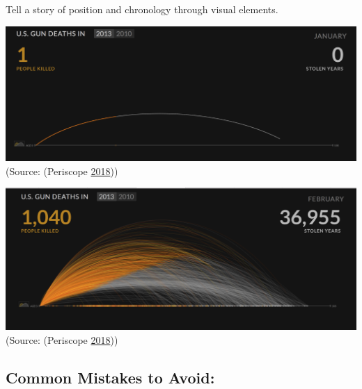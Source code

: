 \documentclass[]{book}
\begin{document}
Tell a story of position and chronology through visual elements.

\includegraphics{images/Tufte_figure11.png}
(Source: (Periscope \protect\hyperlink{ref-narratives_2017}{2018}))

\includegraphics{images/Tufte_figure12.png}
(Source: (Periscope \protect\hyperlink{ref-narratives_2017}{2018}))

\hypertarget{common-mistakes-to-avoid}{%
\subsection{Common Mistakes to Avoid:}\label{common-mistakes-to-avoid}}
\end{document}
